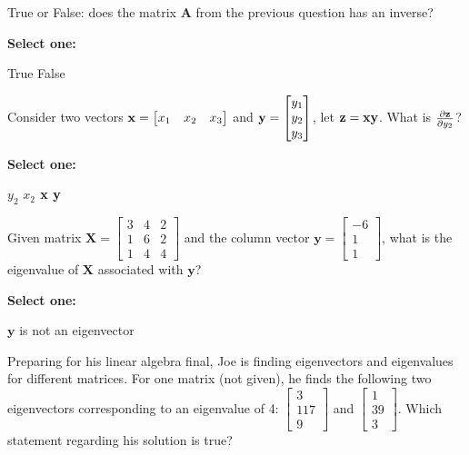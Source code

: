 \documentclass[11pt,addpoints,answers]{exam}
\numberwithin{equation}{section} %
\numberwithin{figure}{section} %
\numberwithin{table}{section} %
\begin{document}
\begin{questions}
    \question[1] True or False: does the matrix $\mathbf{A}$ from the previous question has an inverse?

    \textbf{Select one:}
    \begin{checkboxes}
        \choice True
        \choice False
    \end{checkboxes}

    
    \question[2] Consider two vectors $\mathbf{x} = \begin{bmatrix} x_1 & x_2 & x_3 \end{bmatrix}$ and $\mathbf{y} = \begin{bmatrix} y_1 \\ y_2 \\ y_3 \end{bmatrix}$, let $\mathbf{z} = \mathbf{x} \mathbf{y}$. What is $\frac{\partial \mathbf{z}}{\partial y_2}$? 
    
    \textbf{Select one:}
    \begin{checkboxes}
        \choice $y_2$
        \choice $x_2$
        \choice $\mathbf{x}$
        \choice $\mathbf{y}$
    \end{checkboxes}
    
    
    \question[2] Given matrix $\mathbf{X}=\begin{bmatrix} 3 & 4 & 2 \\ 1 & 6 & 2 \\ 1 & 4 & 4 \end{bmatrix} $ and the column vector $\mathbf{y}=\begin{bmatrix} -6 \\ 1 \\ 1 \end{bmatrix}$, what is the eigenvalue of $\mathbf{X}$ associated with $\mathbf{y}$?

    \textbf{Select one:}
    \begin{checkboxes}
        \choice $\mathbf{y}$ is not an eigenvector
    \end{checkboxes}

    
    \question[2] Preparing for his linear algebra final, Joe is finding eigenvectors and eigenvalues for different matrices. For one matrix (not given), he finds the following two eigenvectors corresponding to an eigenvalue of 4: $\begin{bmatrix} 3 \\ 117 \\ 9 \end{bmatrix}$ and $\begin{bmatrix} 1 \\ 39 \\ 3 \end{bmatrix}$. Which statement regarding his solution is true?
    

\end{questions}
\end{document}
